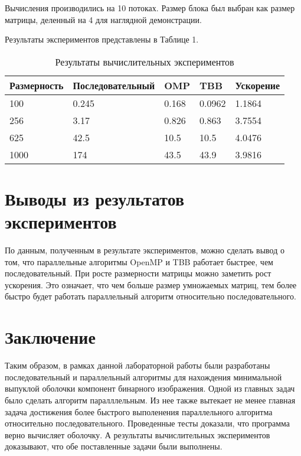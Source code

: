 \documentclass{report}
\begin{document}
\par Вычисления производились на 10 потоках. Размер блока был выбран как размер матрицы, деленный на 4 для наглядной демонстрации.

\par Результаты экспериментов представлены в Таблице 1.

\begin{table}[!h]
\caption{Результаты вычислительных экспериментов}
\centering
\begin{tabular}{| p{3cm} | p{4cm} | p{2cm} | p{2cm} | p{2cm} |} 
\hline
Размерность & Последовательный & OMP & TBB & Ускорение \\ \hline
100 & 0.245 & 0.168 & 0.0962 & 1.1864 \\ \hline
256 & 3.17 & 0.826 & 0.863 & 3.7554 \\ \hline
625 & 42.5 & 10.5 & 10.5 & 4.0476 \\ \hline
1000 & 174 & 43.5 & 43.9 & 3.9816 \\
\hline
\end{tabular}
\end{table}

\newpage

\section*{Выводы из результатов экспериментов}
По данным, полученным в результате экспериментов, можно сделать вывод о том, что параллельные алгоритмы OpenMP и TBB работает быстрее, чем последовательный. При росте размерности матрицы можно заметить рост ускорения. Это означает, что чем больше размер умножаемых матриц,
тем более быстро будет работать параллельный алгоритм относительно последовательного.
\newpage

\section*{Заключение}
Таким образом, в рамках данной лабораторной работы были разработаны последовательный и параллельный алгоритмы для нахождения минимальной выпуклой оболочки компонент бинарного изображения. Одной из главных задач было сделать алгоритм паралллельным. Из нее также вытекает не менее главная задача достижения более быстрого выполенения параллельного алгоритма относительно последовательного. Проведенные тесты доказали, что программа верно вычисляет оболочку. А результаты вычислительных экспериментов доказывают, что обе поставленные задачи были выполнены.
\newpage
\end{document}
